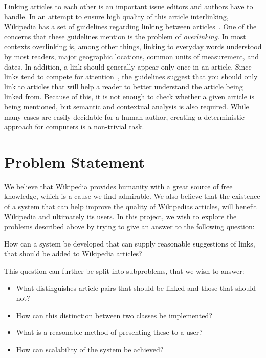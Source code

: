 Linking articles to each other is an important issue editors and authors have to handle. In an attempt to ensure high quality of this article interlinking, Wikipedia has a set of guidelines regarding linking between articles~\cite{wiki-manual-of-style-overlinking}. One of the concerns that these guidelines mention is the problem of \emph{overlinking}. In most contexts overlinking is, among other things, linking to everyday words understood by most readers, major geographic locations, common units of measurement, and dates. In addition, a link should generally appear only once in an article. Since links tend to compete for attention~\cite{hyperlink-structure-using-logs}, the guidelines suggest that you should only link to articles that will help a reader to better understand the article being linked from. Because of this, it is not enough to check whether a given article is being mentioned, but semantic and contextual analysis is also required. While many cases are easily decidable for a human author, creating a deterministic approach for computers is a non-trivial task.

\section{Problem Statement}\label{sec:problem_statement}

We believe that Wikipedia provides humanity with a great source of free knowledge, which is a cause we find admirable. We also believe that the existence of a system that can help improve the quality of Wikipedias articles, will benefit Wikipedia and ultimately its users. In this project, we wish to explore the problems described above by trying to give an answer to the following question:

\begin{formal}
How can a system be developed that can supply reasonable suggestions of links, that should be added to Wikipedia articles?
\end{formal}

This question can further be split into subproblems, that we wish to answer:
\begin{itemize}
	\item What distinguishes article pairs that should be linked and those that should not?
  \item How can this distinction between two classes be implemented?
  \item What is a reasonable method of presenting these to a user?
  \item How can scalability of the system be achieved?
\end{itemize}

